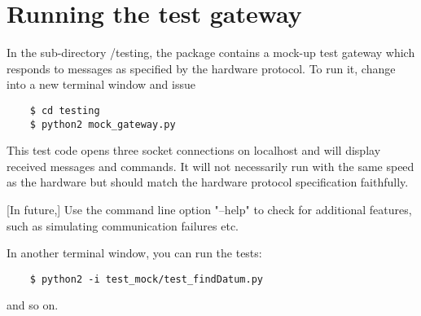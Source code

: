 \documentclass{scrartcl}[12pt,a4paper]
\begin{document}
\section{Running the test gateway} 

In the sub-directory /testing, the package contains a mock-up test
gateway which responds to messages as specified by the hardware
protocol. To run it, change into a new terminal window and
issue

  \begin{verbatim}
    $ cd testing
    $ python2 mock_gateway.py
  \end{verbatim}    


This test code opens three socket connections on localhost and will
display received messages and commands. It will not necessarily run
with the same speed as the hardware but should match the hardware
protocol specification faithfully.

[In future,] Use the command line option "--help" to check for additional features,
such as simulating communication failures etc.

In another terminal window, you can run the tests:
  \begin{verbatim}
    $ python2 -i test_mock/test_findDatum.py
  \end{verbatim}    
and so on.
\end{document}
